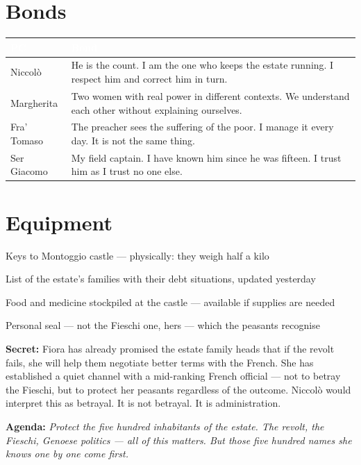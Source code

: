 \section*{Bonds}
\begin{table}[h]\centering\renewcommand{\arraystretch}{1.4}
\begin{tabularx}{\linewidth}{@{}L{2.6cm} X@{}}
\toprule{}
\textcolor{white}{\textbf{PC}} & \textcolor{white}{\textbf{Bond}} \\
\midrule
Niccol\`o & He is the count. I am the one who keeps the estate running. I respect him and correct him in turn. \\
Margherita & Two women with real power in different contexts. We understand each other without explaining ourselves. \\
Fra' Tomaso & The preacher sees the suffering of the poor. I manage it every day. It is not the same thing. \\
Ser Giacomo & My field captain. I have known him since he was fifteen. I trust him as I trust no one else. \\
\bottomrule
\end{tabularx}
\end{table}

\section*{Equipment}
\begin{goldlist}
\item Keys to Montoggio castle --- physically: they weigh half a kilo
\item List of the estate's families with their debt situations, updated yesterday
\item Food and medicine stockpiled at the castle --- available if supplies are needed
\item Personal seal --- not the Fieschi one, hers --- which the peasants recognise
\end{goldlist}

\clearpage
\begin{secretbox}
\textbf{Secret:} Fiora has already promised the estate family heads that if the revolt
fails, she will help them negotiate better terms with the French. She has established
a quiet channel with a mid-ranking French official --- not to betray the Fieschi, but
to protect her peasants regardless of the outcome. Niccol\`o would interpret this
as betrayal. It is not betrayal. It is administration.

\medskip\noindent\textcolor{SecretRed}{\textbf{Agenda:}}
\textit{Protect the five hundred inhabitants of the estate. The revolt, the Fieschi,
Genoese politics --- all of this matters. But those five hundred names she knows
one by one come first.}
\end{secretbox}

